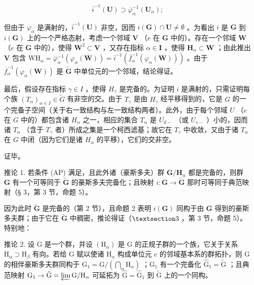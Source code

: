 \[
\overline {{i}} ^ {-1} (\mathbf {U}) \supset \overline {{\varphi}} _ {\alpha} ^ {-1} (\mathbf {U} _ {\alpha});
\]

但由于 \(\varphi_{\alpha}\) 是满射的，\(\overline{i}^{-1}(\mathbf{U})\) 非空，因而 \(i(\mathbf{G}) \cap \mathbf{U} \neq \emptyset\) 。为看出 \(i\) 是 \(\mathbf{G}\) 到 \(i(\mathbf{G})\) 上的一个严格态射，考虑一个邻域 \(\mathbf{V}\) （\(e\) 在 \(\mathbf{G}\) 中的）。存在一个邻域 \(\mathbf{W}\) （\(e\) 在 \(\mathbf{G}\) 中的），使得 \(\mathbf{W}^2 \subset \mathbf{V}\) ，又存在指标 \(\alpha \in \mathbf{I}\) ，使得 \(\mathbf{H}_{\alpha} \subset \mathbf{W}\) ；由此推出 \(\mathbf{V}\) 包含 \(\mathrm{WH}_{\alpha} = \overline{\varphi}_{\alpha}^{-1}(\varphi_{\alpha}(\mathbf{W})) = \overline{i}^{-1}(\overline{f}_{\alpha}^{-1}(\varphi_{\alpha}(\mathbf{W})))\) 。由于 \(\overline{f}_{\alpha}^{-1}(\varphi_{\alpha}(\mathbf{W}))\) 是 \(\tilde{\mathbf{G}}\) 中单位元的一个邻域，结论得证。

最后，假设存在指标 \(\gamma \in I\) ，使得 \(H_{\gamma}\) 是完备的。为证明 \(i\) 是满射的，只需证明每个族 \((T_{\alpha})_{\alpha \in I} \in \tilde{G}\) 有非空的交。由于 \(T_{\gamma}\) 是由 \(H_{\gamma}\) 经平移得到的，它是 \(G\) 的一个完备子空间（关于右一致结构与左一致结构两者）。此外，由于每个邻域 \(U\) （\(e\) 在 \(G\) 中的）都包含诸 \(H_{\alpha}\) 之一，相应的集合 \(T_{\alpha}\) 是 \(U_{d-}\) （或 \(U_{s-}\) ）小的，因而诸 \(T_{\alpha}\) （含于 \(T_{\gamma}\) 者）所成之集是一个柯西滤基；故它在 \(T_{\gamma}\) 中收敛，又由于诸 \(T_{\alpha}\) 在 \(G\) 中闭（因为它们是诸 \(H_{\alpha}\) 的平移），它们的交非空。

证毕。

推论 1. 若条件 (AP) 满足，且此外诸（豪斯多夫）群 \(\mathbf{G} / \mathbf{H}_{\alpha}\) 都是完备的，则群 \(\mathbf{G}\) 有一个可等同于 \(\tilde{\mathbf{G}}\) 的豪斯多夫完备化；且映射 \(i: \mathbf{G} \to \tilde{\mathbf{G}}\) 那时可等同于典范映射（§ 3，第 3 节，命题 5）。

因为此时 \(\tilde{\mathbf{G}}\) 是完备的（第 2 节），且命题 2 表明 \(i(\mathbf{G})\) 同构于由 \(\mathbf{G}\) 得到的豪斯多夫群；由于它在 \(\tilde{\mathbf{G}}\) 中稠密，推论得证（\(\S 3\) ，第 3 节，命题 5）。特别地：

推论 2. 设 G 是一个群，并设 \((\mathrm{H}_{\alpha})\) 是 G 的正规子群的一个族，它关于关系 \(\mathrm{H}_{\alpha} \supset \mathrm{H}_{\beta}\) 有向。若给 G 赋以使诸 \(\mathrm{H}_{\alpha}\) 构成单位元 \(e\) 的邻域基本系的群拓扑，则 G 的相伴豪斯多夫群同构于 \(\mathrm{G}_{1} = \mathrm{G} / \left( \bigcap_{\alpha} \mathrm{H}_{\alpha} \right)\) ；\(\mathrm{G}_{1}\) 有一个完备化 \(\hat{\mathrm{G}}_{1} = \tilde{\mathrm{G}}\) ；且典范映射 \(\mathrm{G}_{1} \to \hat{\mathrm{G}} = \varprojlim \mathrm{G} / \mathrm{H}_{\alpha}\) 可延拓为 \(\hat{\mathrm{G}} = \hat{\mathrm{G}}_{1}\) 到 \(\tilde{\mathrm{G}}\) 上的一个同构。

